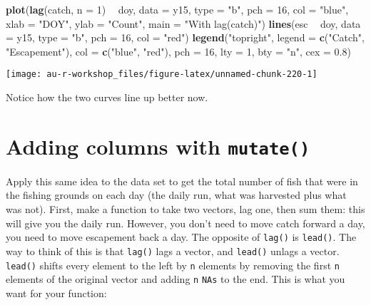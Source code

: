 \documentclass[]{book}
\newenvironment{Shaded}{\begin{snugshade}}{\end{snugshade}}
\newcommand{\KeywordTok}[1]{\textcolor[rgb]{0.13,0.29,0.53}{\textbf{#1}}}
\newcommand{\DataTypeTok}[1]{\textcolor[rgb]{0.13,0.29,0.53}{#1}}
\newcommand{\DecValTok}[1]{\textcolor[rgb]{0.00,0.00,0.81}{#1}}
\newcommand{\FloatTok}[1]{\textcolor[rgb]{0.00,0.00,0.81}{#1}}
\newcommand{\StringTok}[1]{\textcolor[rgb]{0.31,0.60,0.02}{#1}}
\newcommand{\OperatorTok}[1]{\textcolor[rgb]{0.81,0.36,0.00}{\textbf{#1}}}
\newcommand{\NormalTok}[1]{#1}
\theoremstyle{definition}
\theoremstyle{definition}
\theoremstyle{definition}
\theoremstyle{remark}
\begin{document}
\begin{Shaded}
\begin{Highlighting}[]
\KeywordTok{plot}\NormalTok{(}\KeywordTok{lag}\NormalTok{(catch, }\DataTypeTok{n =} \DecValTok{1}\NormalTok{) }\OperatorTok{~}\StringTok{ }\NormalTok{doy, }\DataTypeTok{data =}\NormalTok{ y15, }\DataTypeTok{type =} \StringTok{"b"}\NormalTok{, }\DataTypeTok{pch =} \DecValTok{16}\NormalTok{, }\DataTypeTok{col =} \StringTok{"blue"}\NormalTok{,}
     \DataTypeTok{xlab =} \StringTok{"DOY"}\NormalTok{, }\DataTypeTok{ylab =} \StringTok{"Count"}\NormalTok{, }\DataTypeTok{main =} \StringTok{"With lag(catch)"}\NormalTok{)}
\KeywordTok{lines}\NormalTok{(esc }\OperatorTok{~}\StringTok{ }\NormalTok{doy, }\DataTypeTok{data =}\NormalTok{ y15, }\DataTypeTok{type =} \StringTok{"b"}\NormalTok{, }\DataTypeTok{pch =} \DecValTok{16}\NormalTok{, }\DataTypeTok{col =} \StringTok{"red"}\NormalTok{)}
\KeywordTok{legend}\NormalTok{(}\StringTok{"topright"}\NormalTok{, }\DataTypeTok{legend =} \KeywordTok{c}\NormalTok{(}\StringTok{"Catch"}\NormalTok{, }\StringTok{"Escapement"}\NormalTok{),}
       \DataTypeTok{col =} \KeywordTok{c}\NormalTok{(}\StringTok{"blue"}\NormalTok{, }\StringTok{"red"}\NormalTok{), }\DataTypeTok{pch =} \DecValTok{16}\NormalTok{, }\DataTypeTok{lty =} \DecValTok{1}\NormalTok{, }\DataTypeTok{bty =} \StringTok{"n"}\NormalTok{, }\DataTypeTok{cex =} \FloatTok{0.8}\NormalTok{)}
\end{Highlighting}
\end{Shaded}

\begin{center}\texttt{[image: au-r-workshop\_files/figure-latex/unnamed-chunk-220-1]} \end{center}

Notice how the two curves line up better now.

\section{\texorpdfstring{Adding columns with
\texttt{mutate()}}{Adding columns with mutate()}}\label{adding-columns-with-mutate}

Apply this same idea to the data set to get the total number of fish
that were in the fishing grounds on each day (the daily run, what was
harvested plus what was not). First, make a function to take two
vectors, lag one, then sum them: this will give you the daily run.
However, you don't need to move catch forward a day, you need to move
escapement back a day. The opposite of \texttt{lag()} is
\texttt{lead()}. The way to think of this is that \texttt{lag()} lags a
vector, and \texttt{lead()} unlags a vector. \texttt{lead()} shifts
every element to the left by \texttt{n} elements by removing the first
\texttt{n} elements of the original vector and adding \texttt{n}
\texttt{NAs} to the end. This is what you want for your function:
\end{document}
